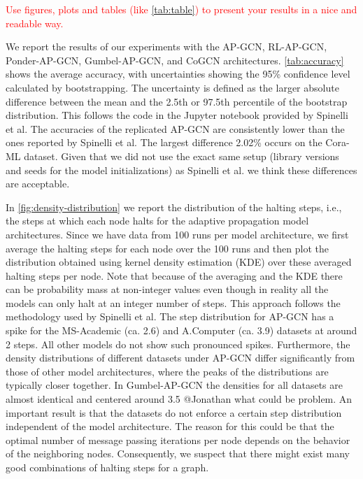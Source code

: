 \documentclass{gdl}
\begin{document}
\textcolor{red}{Use figures, plots and tables (like \autoref{tab:table}) to present your results in a nice and readable way.}


We report the results of our experiments with the AP-GCN, RL-AP-GCN, Ponder-AP-GCN, Gumbel-AP-GCN, and CoGCN architectures. \autoref{tab:accuracy} shows the average accuracy, with uncertainties showing the 95\% confidence level calculated by bootstrapping. The uncertainty is defined as the larger absolute difference between the mean and the 2.5th or 97.5th percentile of the bootstrap distribution. This follows the code in the Jupyter notebook provided by Spinelli et al. The accuracies of the replicated AP-GCN are consistently lower than the ones reported by Spinelli et al. The largest difference 2.02\% occurs on the Cora-ML dataset. Given that we did not use the exact same setup (library versions and seeds for the model initializations) as Spinelli et al. we think these differences are acceptable. 

In \autoref{fig:density-distribution} we report the distribution of the halting steps, i.e., the steps at which each node halts for the adaptive propagation model architectures. Since we have data from 100 runs per model architecture, we first average the halting steps for each node over the 100 runs and then plot the distribution obtained using kernel density estimation (KDE) over these averaged halting steps per node. Note that because of the averaging and the KDE there can be probability mass at non-integer values even though in reality all the models can only halt at an integer number of steps. This approach follows the methodology used by Spinelli et al. The step distribution for AP-GCN has a spike for the MS-Academic (ca. 2.6) and A.Computer (ca. 3.9) datasets at around 2 steps. All other models do not show such pronounced spikes. Furthermore,  the density distributions of different datasets under AP-GCN differ significantly from those of other model architectures, where the peaks of the distributions are typically closer together. In Gumbel-AP-GCN the densities for all datasets are almost identical and centered around 3.5 @Jonathan what could be problem. An important result is that the datasets do not enforce a certain step distribution independent of the model architecture. The reason for this could be that the optimal number of message passing iterations per node depends on the behavior of the neighboring nodes. Consequently, we suspect that there might exist many good combinations of halting steps for a graph.
\end{document}
